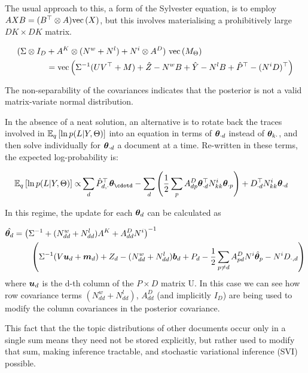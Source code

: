 The usual approach to this, a form of the Sylvester equation, is to employ $AXB = (B\T \otimes A)\vecf{X}$, but this involves materialising a prohibitively large $DK \times DK$ matrix. 

\begin{align*}
(\Sigma \otimes I_D & + A^K \otimes (N^w + N^l) + N^i \otimes A^D) \text{ }\vecf{M_\Theta}\\
& = \vecf{\inv{\Sigma}(UV\T + M) + \hat{Z} - N^w B + \hat{Y} - N^l B + \hat{P}\T - (N^i D)\T}
\end{align*}

The non-separability of the covariances indicates that the posterior is not a valid matrix-variate normal distribution.

In the absence of a neat solution, an alternative is to rotate back the traces involved in $\ex{\ln p(L|Y,\Theta)}{q}$ into an equation in terms of $\thod$ instead of $\thko$, and then solve individually for $\thod$ a document at a time. Re-written in these terms, the expected log-probability is:

\begin{align}
\ex{\ln p(L|Y,\Theta)}{q} \propto & \sum_d \hat{P}_{d,\cdot}\T \vv{\theta}_{\cdotd}
-  \sum_d \left(\half \sum_p A^D_{dp} \vv{\theta}_{\cdot d}\T  N^i_{kk} \vv{\theta}_{\cdot p}\right)    
    + D_{\cdot d} \T N^i_{kk} \vv{\theta_{\cdot d}}
\end{align}

In this regime, the update for each $\vv{\theta}_d$ can be calculated as

\begin{align}
\hat{\thd} & = \invb{\inv{\Sigma} + (N^w_{dd} + N^l_{dd})A^K + A^D_{dd} N^i}\\
& \qquad
\left( 
    \inv{\Sigma}(V \vv{u}_d + \vv{m}_d) + Z_d - (N^w_{dd} + N^l_{dd}) \vv{b}_d + P_d - \half \sum_{p \neq d} A^D_{pd} N^i \hat{\vv{\theta}}_p - N^i D_{\cdot, d}
\right) \label{eqn:monster-thd}
\end{align}
where $\vv{u}_d$ is the d-th column of the $P \times D$ matrix U. In this case we can see how row covariance terms $(N^w_{dd} + N^l_{dd})$, $A^D_{dd}$ (and implicitly $I_D$) are being used to modify the column covariances in the posterior covariance.

This fact that the the topic distributions of other documents occur only in a single sum means they need not be stored explicitly, but rather used to modify that sum, making inference tractable, and stochastic variational inference (SVI) possible.

